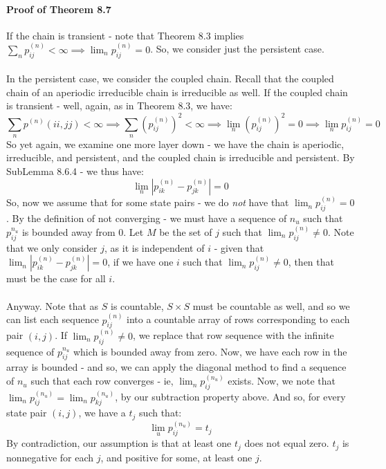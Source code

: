 \documentclass[12pt,a4paper]{article}
\newcommand{\1}[1]{\mathbbm{1}\left\{ #1 \right\}}
\begin{document}
\paragraph{Proof of Theorem 8.7} If the chain is transient - note that Theorem 8.3 implies $\sum_n p_{ij}^{(n)} < \infty \implies \lim_n p_{ij}^{(n)} = 0$. So, we consider just the persistent case.
\\\\
In the persistent case, we consider the coupled chain. Recall that the coupled chain of an aperiodic irreducible chain is irreducible as well. If the coupled chain is transient - well, again, as in Theorem 8.3, we have:
$$
	\sum_n p^{(n)}(ii,jj) < \infty \implies
	\sum_n (p_{ij}^{(n)})^2 < \infty \implies
	\lim_n (p_{ij}^{(n)})^2 = 0 \implies
	\lim_n p_{ij}^{(n)} = 0
$$
So yet again, we examine one more layer down - we have the chain is aperiodic, irreducible, and persistent, and the coupled chain is irreducible and persistent. By SubLemma 8.6.4 - we thus have:
$$
	\lim_n \left|p_{ik}^{(n)} - p_{jk}^{(n)}\right| = 0
$$
So, now we assume that for some state pairs - we do \textit{not} have that $\lim_n p_{ij}^{(n)} = 0$. By the definition of not converging - we must have a sequence of $n_u$ such that $p_{ij}^{n_u}$ is bounded away from $0$. Let $M$ be the set of $j$ such that $\lim_n p_{ij}^{(n)} \neq 0$. Note that we only consider $j$, as it is independent of $i$ - given that $\lim_n \left|p_{ik}^{(n)} - p_{jk}^{(n)}\right| = 0$, if we have one $i$ such that $\lim_n p_{ij}^{(n)} \neq 0$, then that must be the case for all $i$.
\\\\
Anyway. Note that as $S$ is countable, $S \times S$ must be countable as well, and so we can list each sequence $p_{ij}^{(n)}$ into a countable array of rows corresponding to each pair $(i,j)$. If $\lim_n p_{ij}^{(n)} \neq 0$, we replace that row sequence with the infinite sequence of $p_{ij}^{n_u}$ which is bounded away from zero. Now, we have each row in the array is bounded - and so, we can apply the diagonal method to find a sequence of $n_u$ such that each row converges - ie, $\lim_n p_{ij}^{(n_u)}$ exists. Now, we note that $\lim_n p_{ij}^{(n_u)} = \lim_n p_{kj}^{(n_u)}$, by our subtraction property above. And so, for every state pair $(i,j)$, we have a $t_j$ such that:
$$
	\lim_u p_{ij}^{(n_u)} = t_j
$$
By contradiction, our assumption is that at least one $t_j$ does not equal zero. $t_j$ is nonnegative for each $j$, and positive for some, at least one $j$.
\\\\
\end{document}
